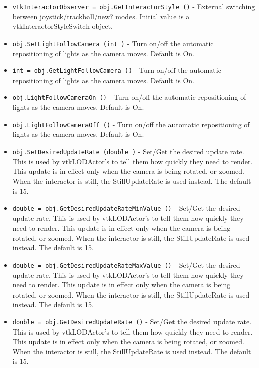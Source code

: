 \begin{itemize}
\item  \verb|vtkInteractorObserver = obj.GetInteractorStyle ()| -  External switching between joystick/trackball/new? modes. Initial value
 is a vtkInteractorStyleSwitch object.

\item  \verb|obj.SetLightFollowCamera (int )| -  Turn on/off the automatic repositioning of lights as the camera moves.
 Default is On.

\item  \verb|int = obj.GetLightFollowCamera ()| -  Turn on/off the automatic repositioning of lights as the camera moves.
 Default is On.

\item  \verb|obj.LightFollowCameraOn ()| -  Turn on/off the automatic repositioning of lights as the camera moves.
 Default is On.

\item  \verb|obj.LightFollowCameraOff ()| -  Turn on/off the automatic repositioning of lights as the camera moves.
 Default is On.

\item  \verb|obj.SetDesiredUpdateRate (double )| -  Set/Get the desired update rate. This is used by vtkLODActor's to tell
 them how quickly they need to render.  This update is in effect only
 when the camera is being rotated, or zoomed.  When the interactor is
 still, the StillUpdateRate is used instead. 
 The default is 15.

\item  \verb|double = obj.GetDesiredUpdateRateMinValue ()| -  Set/Get the desired update rate. This is used by vtkLODActor's to tell
 them how quickly they need to render.  This update is in effect only
 when the camera is being rotated, or zoomed.  When the interactor is
 still, the StillUpdateRate is used instead. 
 The default is 15.

\item  \verb|double = obj.GetDesiredUpdateRateMaxValue ()| -  Set/Get the desired update rate. This is used by vtkLODActor's to tell
 them how quickly they need to render.  This update is in effect only
 when the camera is being rotated, or zoomed.  When the interactor is
 still, the StillUpdateRate is used instead. 
 The default is 15.

\item  \verb|double = obj.GetDesiredUpdateRate ()| -  Set/Get the desired update rate. This is used by vtkLODActor's to tell
 them how quickly they need to render.  This update is in effect only
 when the camera is being rotated, or zoomed.  When the interactor is
 still, the StillUpdateRate is used instead. 
 The default is 15.


\end{itemize}
